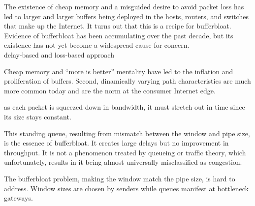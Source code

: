 The existence of cheap memory and a misguided desire to avoid packet loss has led to larger and larger buffers being deployed in the hosts, routers, and switches that make up the Internet. It turns out that this is a recipe for bufferbloat. Evidence of bufferbloat has been accumulating over the past decade, but its existence has not yet become a widespread cause for concern.\\




delay-based and loss-based approach

\cite{NicholsJacobsonCQD}
Cheap memory and ``more is better'' mentality have led to the inflation and proliferation of buffers. Second, dinamically varying path characteristics are much more common today and are the norm at the consumer Internet edge.

as each packet is squeezed down in bandwidth, it must stretch out in time since its size stays constant.

This standing queue, resulting from mismatch between the window and pipe size, is the essence of bufferbloat. It creates large delays but no improvement in throughput. It is not a phenomenon treated by queueing or traffic theory, which unfortunately, results in it being almost universally misclassified as congestion.

The bufferbloat problem, making the window match the pipe size, is hard to address. Window sizes are chosen by senders while queues manifest at bottleneck gateways.
